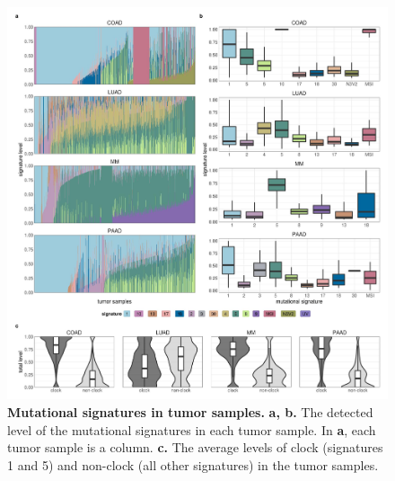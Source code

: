 \documentclass[english, 10pt, letterpaper]{article}
\newcommand{\beginsupplement}{%
        \setcounter{table}{0}
        \renewcommand{\thetable}{\arabic{table}}%
        \setcounter{figure}{0}
        \renewcommand{\thefigure}{\arabic{figure}}%
    }
\begin{document}
\beginsupplement

\makeatletter
\renewcommand{\fnum@figure}{Supplementary \figurename~\thefigure}
\makeatother


\begin{figure}[h!]
\centering
\includegraphics[width=180mm]{figures/Supp_Fig_1.jpeg}
\caption{
    \textbf{Mutational signatures in tumor samples.}
    \textbf{a, b.} The detected level of the mutational signatures in each tumor sample. In \textbf{a}, each tumor sample is a column.
    \textbf{c.} The average levels of clock (signatures 1 and 5) and non-clock (all other signatures) in the tumor samples.
}
\label{sfig:mutational-signatures-supp}
\end{figure}
\newpage
\end{document}
